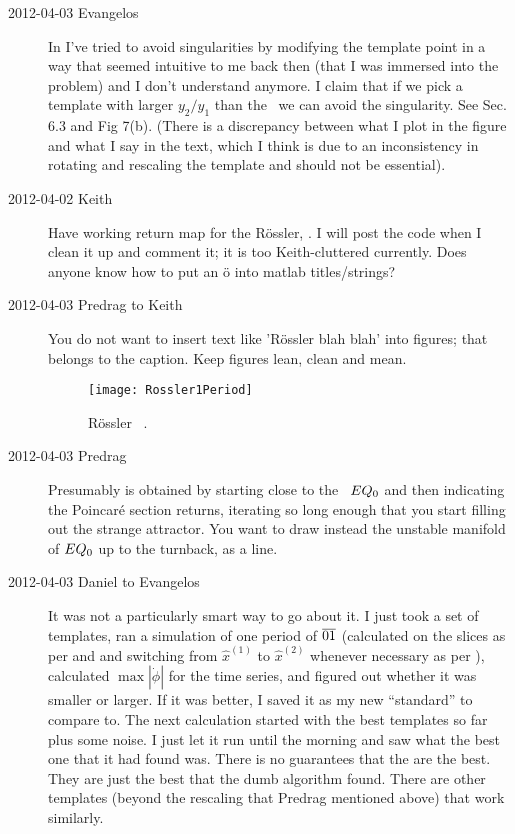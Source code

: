 \begin{description}
\item[2012-04-03 Evangelos]
In  I've tried to avoid singularities by modifying the
template point in a way that seemed intuitive to me back then (that I was immersed
into the problem) and I don't understand anymore. I claim that if we pick a template
with larger $y_2/y_1$ than the \reqv\ we can avoid
the singularity. See Sec. 6.3 and Fig 7(b).
(There is a discrepancy between what I plot in the figure and what I say in the
text, which I think is due to an inconsistency in rotating and rescaling the
template and should not be essential).


\item[2012-04-02 Keith] Have working return map for the
R\"ossler, .  I will post the code
when I clean it up and comment it; it is too Keith-cluttered currently.
Does anyone know how to put an \"o into matlab titles/strings?

\item[2012-04-03 Predrag to Keith] You do not want to insert text like
'R\"ossler blah blah' into figures; that belongs to the caption. Keep
figures lean, clean and mean.

\begin{figure}
\begin{center}
\texttt{[image: Rossler1Period]}
\end{center}
  \caption{
R\"ossler \po\ .
  }
\label{fig:Ros1Per}
\end{figure}

\item[2012-04-03 Predrag] Presumably  is obtained
by starting close to the \eqv\ $EQ_{0}$ and then indicating the
Poincar\'e section returns, iterating so long enough that you start
filling out the strange attractor. You want to draw instead the unstable
manifold of $EQ_{0}$ up to the turnback, as a line.

\item[2012-04-03 Daniel to Evangelos]
It was not a particularly smart way to go about it. I just took a set of
templates, ran a simulation of one period of $\overline{01}$ (calculated
on the slices as per  and   and
switching from $\hat{x}^{(1)}$ to $\hat{x}^{(2)}$ whenever necessary as
per ), calculated $\max |\dot{\phi}|$ for the time
series, and figured out whether it was smaller or larger. If it was
better, I saved it as my new ``standard'' to compare to. The next
calculation started with the best templates so far plus some noise. I
just let it run until the morning and saw what the best one that it had
found was. There is no guarantees that the are the best. They are just
the best that the dumb algorithm found. There are other templates (beyond
the rescaling that Predrag mentioned above) that work similarly.


\end{description}
